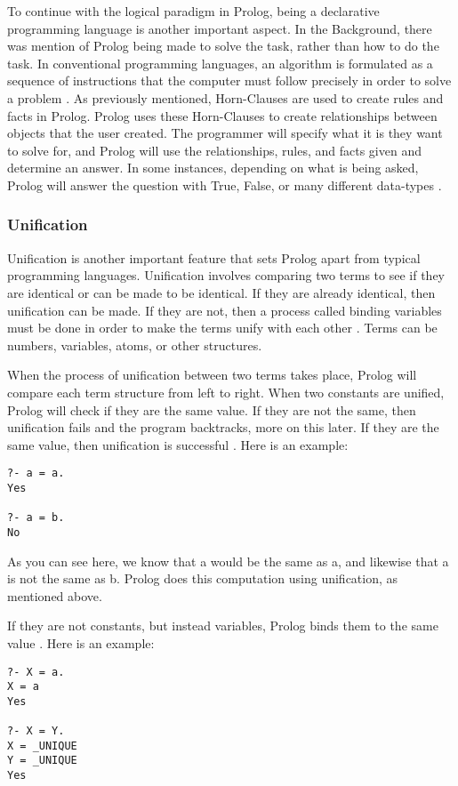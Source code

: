 \documentclass{article}
\theoremstyle{theorem}
\theoremstyle{definition}
\theoremstyle{remark}
\begin{document}
\noindent\newline To continue with the logical paradigm in Prolog, being a declarative programming language is another important aspect. In the Background, there was mention of Prolog being made to solve the task, rather than how to do the task. In conventional programming languages, an algorithm is formulated as a sequence of instructions that the computer must follow precisely in order to solve a problem \cite{(9)}. As previously mentioned, Horn-Clauses are used to create rules and facts in Prolog. Prolog uses these Horn-Clauses to create relationships between objects that the user created. The programmer will specify what it is they want to solve for, and Prolog will use the relationships, rules, and facts given and determine an answer. In some instances, depending on what is being asked, Prolog will answer the question with True, False, or many different data-types \cite{(10)}. 


\subsubsection{Unification}
Unification is another important feature that sets Prolog apart from typical programming languages. Unification involves comparing two terms to see if they are identical or can be made to be identical. If they are already identical, then unification can be made. If they are not, then a process called binding variables must be done in order to make the terms unify with each other \cite{(11)}. Terms can be numbers, variables, atoms, or other structures. 

\noindent\newline When the process of unification between two terms takes place, Prolog will compare each term structure from left to right. When two constants are unified, Prolog will check if they are the same value. If they are not the same, then unification fails and the program backtracks, more on this later. If they are the same value, then unification is successful \cite{(12)}. Here is an example:
\begin{verbatim}
?- a = a.
Yes

?- a = b.
No

\end{verbatim}

As you can see here, we know that a would be the same as a, and likewise that a is not the same as b. Prolog does this computation using unification, as mentioned above.

If they are not constants, but instead variables, Prolog binds them to the same value \cite{(12)}. Here is an example:
\begin{verbatim}
?- X = a.
X = a
Yes

?- X = Y.
X = _UNIQUE
Y = _UNIQUE
Yes

\end{verbatim}
\end{document}
